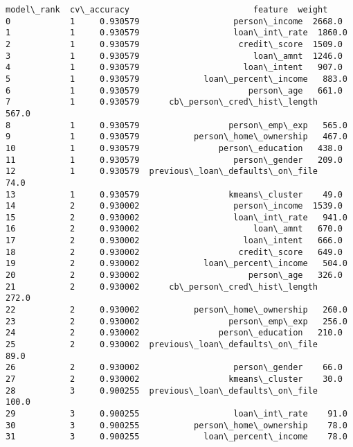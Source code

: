 \documentclass[11pt]{article}
\makeatletter
\newcommand{\boxspacing}{\kern\kvtcb@left@rule\kern\kvtcb@boxsep}
\newcommand{\prompt}[4]{
        {\ttfamily\llap{{\color{#2}[#3]:\hspace{3pt}#4}}\vspace{-\baselineskip}}
    }
\makeatother
\begin{document}
            \begin{tcolorbox}[breakable, size=fbox, boxrule=.5pt, pad at break*=1mm, opacityfill=0]
\prompt{Out}{outcolor}{ }{\boxspacing}
\begin{Verbatim}[commandchars=\\\{\}]
    model\_rank  cv\_accuracy                         feature  weight
0            1     0.930579                   person\_income  2668.0
1            1     0.930579                   loan\_int\_rate  1860.0
2            1     0.930579                    credit\_score  1509.0
3            1     0.930579                       loan\_amnt  1246.0
4            1     0.930579                     loan\_intent   907.0
5            1     0.930579             loan\_percent\_income   883.0
6            1     0.930579                      person\_age   661.0
7            1     0.930579      cb\_person\_cred\_hist\_length   567.0
8            1     0.930579                  person\_emp\_exp   565.0
9            1     0.930579           person\_home\_ownership   467.0
10           1     0.930579                person\_education   438.0
11           1     0.930579                   person\_gender   209.0
12           1     0.930579  previous\_loan\_defaults\_on\_file    74.0
13           1     0.930579                  kmeans\_cluster    49.0
14           2     0.930002                   person\_income  1539.0
15           2     0.930002                   loan\_int\_rate   941.0
16           2     0.930002                       loan\_amnt   670.0
17           2     0.930002                     loan\_intent   666.0
18           2     0.930002                    credit\_score   649.0
19           2     0.930002             loan\_percent\_income   504.0
20           2     0.930002                      person\_age   326.0
21           2     0.930002      cb\_person\_cred\_hist\_length   272.0
22           2     0.930002           person\_home\_ownership   260.0
23           2     0.930002                  person\_emp\_exp   256.0
24           2     0.930002                person\_education   210.0
25           2     0.930002  previous\_loan\_defaults\_on\_file    89.0
26           2     0.930002                   person\_gender    66.0
27           2     0.930002                  kmeans\_cluster    30.0
28           3     0.900255  previous\_loan\_defaults\_on\_file   100.0
29           3     0.900255                   loan\_int\_rate    91.0
30           3     0.900255           person\_home\_ownership    78.0
31           3     0.900255             loan\_percent\_income    78.0

\end{Verbatim}
\end{tcolorbox}
\end{document}
